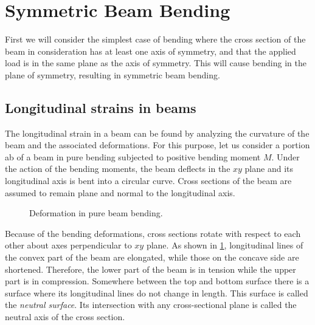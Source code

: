 \documentclass[
10pt,
a4paper,
openany,
svgnames,
]{book} %
\begin{document}
\section{Symmetric Beam Bending}

First we will consider the simplest case of bending where the cross section of the beam in consideration has at least one axis of symmetry, and that the applied load is in the same plane as the axis of symmetry. This will cause bending in the plane of symmetry, resulting in symmetric beam bending.

\subsection{Longitudinal strains in beams}

The longitudinal strain in a beam can be found by analyzing the curvature of the beam and the associated deformations. For this purpose, let us consider a portion ab of a beam in pure bending subjected to positive bending moment $M$. Under the action of the bending moments, the beam deflects in the $xy$ plane and its longitudinal axis is bent into a circular curve. Cross sections of the beam are assumed to remain plane and normal to the longitudinal axis.

\begin{figure}[h]
  \centering
  \caption{Deformation in pure beam bending.}
  \label{fig: pure bending}
\end{figure}

Because of the bending deformations, cross sections rotate with respect to each other about axes perpendicular to $xy$ plane. As shown in \cref{fig: pure bending}, longitudinal lines of the convex part of the beam are elongated, while those on the concave side are shortened. Therefore, the lower part of the beam is in tension while the upper part is in compression. Somewhere between the top and bottom surface there is a surface where its longitudinal lines do not change in length. This surface is called the \emph{neutral surface}. Its intersection with any cross-sectional plane is called the neutral axis of the cross section.
\end{document}
